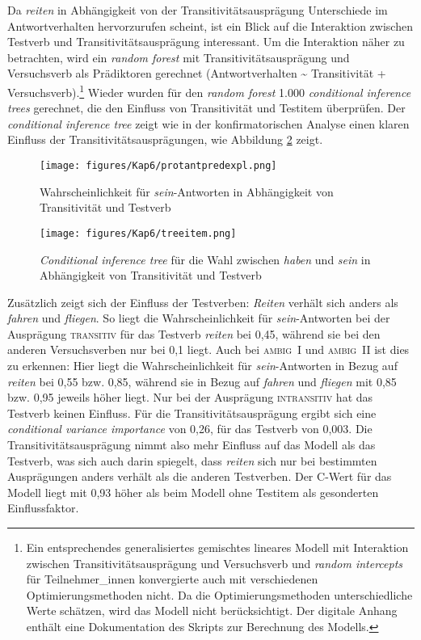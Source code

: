 Da \textit{reiten} in Abhängigkeit von der Transitivitätsausprägung Unterschiede im Antwortverhalten hervorzurufen scheint, ist ein Blick auf die Interaktion zwischen Testverb und Transitivitätsausprägung interessant. Um die Interaktion näher zu betrachten, wird ein \textit{random forest} mit Transitivitätsausprägung und Versuchsverb als Prädiktoren gerechnet (Antwortverhalten \~{} Transitivität + Versuchsverb).\footnote{Ein entsprechendes generalisiertes gemischtes lineares Modell mit Interaktion zwischen Transitivitätsausprägung und Versuchsverb und \textit{random intercepts} für Teilnehmer\_innen konvergierte auch mit verschiedenen Optimierungsmethoden nicht. Da die Optimierungsmethoden unterschiedliche Werte schätzen, wird das Modell nicht berücksichtigt. Der digitale Anhang enthält eine Dokumentation des Skripts zur Berechnung des
Modells.} Wieder wurden für den \textit{random forest} 1.000 \textit{conditional inference trees} gerechnet, die den Einfluss von Transitivität und Testitem überprüfen. Der \textit{conditional inference tree} zeigt wie in der konfirmatorischen Analyse einen klaren Einfluss der Transitivitätsausprägungen, wie Abbildung \ref{treetransitem} zeigt.


\begin{figure}[p]
\texttt{[image: figures/Kap6/protantpredexpl.png]} 
\caption{Wahrscheinlichkeit für \textit{sein}-Antworten in Abhängigkeit von Transitivität und Testverb}
\label{predantexpl}
\end{figure}

\begin{figure}[p]
\texttt{[image: figures/Kap6/treeitem.png]} 
\caption{\textit{Conditional inference tree} für die Wahl zwischen \textit{haben} und \textit{sein} in Abhängigkeit von Transitivität und Testverb}
\label{treetransitem}
\end{figure}

Zusätzlich zeigt sich der Einfluss der Testverben: \textit{Reiten} verhält sich anders als \textit{fahren} und \textit{fliegen}. So liegt die Wahrscheinlichkeit für \textit{sein}-Antworten bei der Ausprägung \textsc{transitiv} für das Testverb \textit{reiten} bei 0,45, während sie bei den anderen Versuchsverben nur bei 0,1 liegt. Auch bei \textsc{ambig~I} und \textsc{ambig~II} ist dies zu erkennen: Hier liegt die Wahrscheinlichkeit für \textit{sein}-Antworten in Bezug auf \textit{reiten} bei 0,55 bzw. 0,85, während sie in Bezug auf \textit{fahren} und \textit{fliegen} mit 0,85 bzw. 0,95 jeweils höher liegt. Nur bei der Ausprägung \textsc{intransitiv} hat das Testverb keinen Einfluss. Für die Transitivitätsausprägung ergibt sich eine \textit{con\-di\-tional variance importance} von 0,26, für das Testverb von 0,003. Die Transitivitätsausprägung nimmt also mehr Einfluss auf das Modell als das Testverb, was sich auch darin spiegelt, dass \textit{reiten} sich nur bei bestimmten Ausprägungen anders verhält als die anderen Testverben. Der C-Wert für das Modell liegt mit 0,93 höher als beim Modell ohne Testitem als gesonderten Einflussfaktor.

